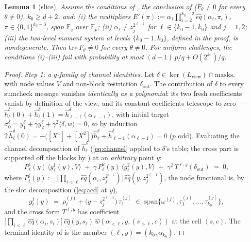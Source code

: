 \documentclass{article}
\newcommand{\Fp}{\mathbb{F}_p}
\newcommand{\Fq}{\mathbb{F}_q}
\newcommand{\extdeg}{d}
\newtheorem{lemma}[theorem]{Lemma}
\theoremstyle{definition}
\begin{document}
\begin{lemma}[slice]\label{lem:fullslice}
Assume the conditions of , the conclusion of  ($F_\theta \neq 0$ for every $\theta \neq 0$), $k_0 \geq \extdeg + 2$, and:
(i) the multipliers $E'(\pi) := \alpha_1 \prod_{i=2}^{k_0 - 2} \hat{eq}(\alpha_i, \pi_i)$, $\pi \in \{0,1\}^{k_0 - 3}$, span $\Fq$ over $\Fp$;
(ii) $\alpha_\ell \neq z_j^{2^{\ell-1}}$ for $\ell \in \{k_0 - 1, k_0\}$ and $j = 1, 2$;
(iii) the two-level moment system at levels $\{k_0 - 1, k_0\}$, defined in the proof, is nondegenerate.
Then $\mathrm{tr} \circ F_\theta \neq 0$ for \emph{every} $\theta \neq 0$. For uniform challenges, the conditions (i)--(iii) fail with probability at most $(\extdeg - 1)\, p/q + O(2^{k_0})/q$.
\end{lemma}

\begin{proof}
\emph{Step 1: a $y$-family of channel identities.} Let $\delta \in \ker(L_{\mathrm{view}}) \cap \mathrm{masks}$, with node values $V$ and non-block restriction $\delta_{\mathrm{out}}$. The contribution of $\delta$ to every sumcheck message vanishes \emph{identically as a polynomial}: its two fresh coefficients vanish by definition of the view, and its constant coefficients telescope to zero --- $\hat{h}^\delta_\ell(0) + \hat{h}^\delta_\ell(1) = \hat{h}^\delta_{\ell-1}(\alpha_{\ell-1})$, with initial target $\sigma_0^\delta = y_1^\delta + \gamma y_2^\delta + \gamma^2 \langle \delta, w \rangle = 0$, so by induction $2\,\hat{h}^\delta_\ell(0) = -\big([X^1] + [X^2]\big)\hat{h}^\delta_\ell + \hat{h}^\delta_{\ell-1}(\alpha_{\ell-1}) = 0$ ($p$ odd). Evaluating the channel decomposition of $\hat{h}^\delta_\ell$ (\cref{eq:channel} applied to $\delta$'s table; the cross part is supported off the blocks by ) at an \emph{arbitrary} point $y$:
\begin{equation}\label{eq:yfam}
P^1_\ell(y)\, \big\langle g^1_\ell(y), V \big\rangle \;+\; \gamma\, P^2_\ell(y)\, \big\langle g^2_\ell(y), V \big\rangle \;+\; \gamma^2\, T^{\ell, y}(\delta_{\mathrm{out}}) \;=\; 0 ,
\end{equation}
where $P^j_\ell(y) := \big[\prod_{i<\ell} \hat{eq}(\alpha_i, z_j^{2^{i-1}})\big]\, \hat{eq}(y, z_j^{2^{\ell-1}})$, the node functional is, by the slot decomposition (\cref{eq:acd} at $y$),
\[
g^j_\ell(y) \;=\; \rho^{(j)}_\ell + \big(y - z_j^{2^{\ell-1}}\big)\, \tau^{(j)}_\ell \;\in\; \mathrm{span}\{\omega^{(j)}, \tau^{(j)}_1, \dots, \tau^{(j)}_{k_0}\} ,
\]
and the cross form $T^{\ell, y}$ has coefficient $\big[\prod_{i < \ell} \hat{eq}(\alpha_i, s_i)\big]\, \hat{eq}(y, s_\ell)\, \hat{w}(\alpha_{<\ell}, y, (s_{>\ell}, c))$ at the cell $(s, c)$. The terminal identity of  is the member $(\ell, y) = (k_0, \alpha_{k_0})$.


\end{proof}
\end{document}
